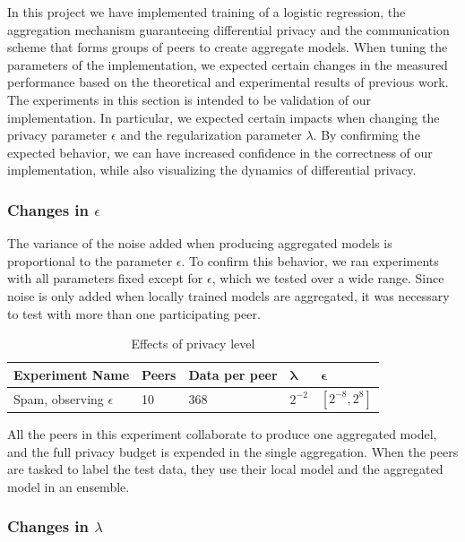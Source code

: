 In this project we have implemented training of a logistic regression, the aggregation mechanism guaranteeing differential privacy and the communication scheme that forms groups of peers to create aggregate models. When tuning the parameters of the implementation, we expected certain changes in the measured performance based on the theoretical and experimental results of previous work. The experiments in this section is intended to be validation of our implementation. In particular, we expected certain impacts when changing the privacy parameter $\epsilon$ and the regularization parameter $\lambda$. By confirming the expected behavior, we can have increased confidence in the correctness of our implementation, while also visualizing the dynamics of differential privacy.

\subsubsection{Changes in $\epsilon$}

The variance of the noise added when producing aggregated models is proportional to the parameter $\epsilon$. To confirm this behavior, we ran experiments with all parameters fixed except for $\epsilon$, which we tested over a wide range. Since noise is only added when locally trained models are aggregated, it was necessary to test with more than one participating peer.

\begin{table}[h]
	\centering
	\caption{Effects of privacy level}
	\label{tab:experiments_privacy_level}
	\begin{tabular}{|l|l|l|l|l|}
		\textbf{Experiment Name}            & \textbf{Peers} & \textbf{Data per peer} &
		 $\boldsymbol{\lambda}$ & $\boldsymbol{\epsilon}$                                              \\
		 \hline
		Spam, observing $\epsilon$ & 10    & 368  & $2^{-2}$  & $[2^{-8}, 2^{8}]$
	\end{tabular}
\end{table}

All the peers in this experiment collaborate to produce one aggregated model, and the full privacy budget is expended in the single aggregation. When the peers are tasked to label the test data, they use their local model and the aggregated model in an ensemble.

\subsubsection{Changes in $\lambda$}

